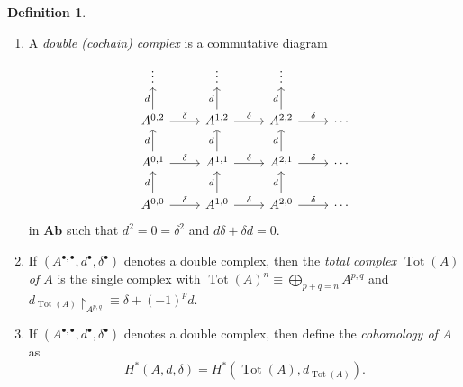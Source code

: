 \documentclass[10pt,letterpaper,cm]{nupset}
\theoremstyle{definition}
\newtheorem{definition}{Definition}[subsection]
\theoremstyle{theorem}
\theoremstyle{remark}
\newcommand{\1}{\mathbb{1}}
\newcommand{\0}{\vec 0}
\DeclareMathOperator{\tot}{Tot}
\begin{document}
\begin{definition} $ $
\begin{enumerate}
\item A \textit{double (cochain) complex} is a commutative diagram 
\[
\begin{tikzcd}
\vdots                                       & \vdots                                       & \vdots                                       &        \\
{A^{0,2}} \arrow[u, "d"] \arrow[r, "\delta"] & {A^{1,2}} \arrow[u, "d"] \arrow[r, "\delta"] & {A^{2,2}} \arrow[u, "d"] \arrow[r, "\delta"] & \cdots \\
{A^{0,1}} \arrow[u, "d"] \arrow[r, "\delta"] & {A^{1,1}} \arrow[u, "d"] \arrow[r, "\delta"] & {A^{2,1}} \arrow[u, "d"] \arrow[r, "\delta"] & \cdots \\
{A^{0,0}} \arrow[u, "d"] \arrow[r, "\delta"] & {A^{1,0}} \arrow[u, "d"] \arrow[r, "\delta"] & {A^{2,0}} \arrow[u, "d"] \arrow[r, "\delta"] & \cdots
\end{tikzcd}
\] in $\mathbf{Ab}$ such that $d^2 = 0 = \delta^2$ and $d{\delta} + \delta{d} =0$.
\item If $\left(A^{\bullet, \bullet}, d^{\bullet}, \delta^{\bullet}\right)$ denotes a double complex, then the \textit{total complex $\tot(A)$ of $A$} is the single complex with $\tot(A)^n \equiv \bigoplus_{p+q = n} A^{p,q}$ and $d_{\tot(A)} \restriction_{A^{p,q}} \equiv  \delta + ({-1})^pd$.
\item If $\left(A^{\bullet, \bullet}, d^{\bullet}, \delta^{\bullet}\right)$ denotes a double complex, then define the \textit{cohomology of $A$} as $$H^{\ast}(A, d, \delta) = H^{\ast}(\tot(A), d_{\tot(A)}).$$
\end{enumerate}
\end{definition}
\end{document}

